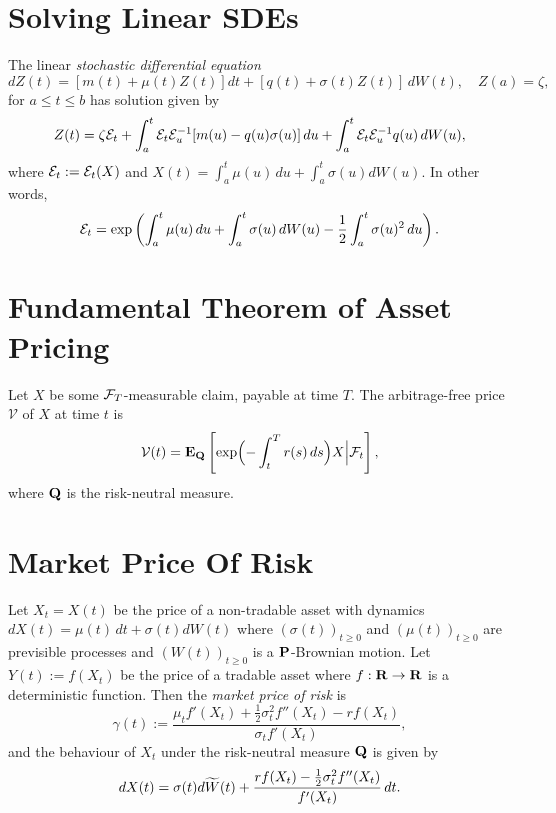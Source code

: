 \documentclass[twocolumn]{amsart}
\begin{document}
\section*{Solving Linear SDEs}

The linear \emph{stochastic differential equation}
\begin{equation*}
    dZ(t) = [m(t)+\mu(t)Z(t)]dt + [q(t)+\sigma(t)Z(t)]\,dW(t), \quad Z(a) = \zeta,
\end{equation*}
for $a \le t \le b$ has solution given by
\begin{equation*}
    Z(t) = \zeta \sE_t + \int_a^t \sE_t \sE_u^{-1}[m(u)-q(u)\sigma(u)]\,du + \int_a^t \sE_t \sE_u^{-1} q(u)\,dW(u),
\end{equation*}
where $\sE_t := \sE_t(X)$ and $X(t) = \int_a^t\mu(u)\,du + \int_a^t\sigma(u)dW(u)$. In other words,
\begin{equation*}
    \sE_t = \exp\left(\int_a^t\mu(u)\,du + \int_a^t\sigma(u)\,dW(u) - \frac{1}{2} \int_a^t \sigma(u)^2\,du\right).
\end{equation*}


\section*{Fundamental Theorem of Asset Pricing}

Let $X$ be some $\F_T$-measurable claim, payable at time $T$. The arbitrage-free price $\mathcal{V}$ of $X$ at time $t$ is
\begin{equation*}
    \mathcal{V}(t) = \EQ\left[\exp\Bigl(-\int_t^T r(s)\,ds\Bigr) X \Bigl| \F_t \Bigr.\right],
\end{equation*}
where $\Q$ is the risk-neutral measure.

\section*{Market Price Of Risk}

Let $X_t = X(t)$ be the price of a non-tradable asset with dynamics $dX(t) =  \mu(t)\,dt + \sigma(t) dW(t)$ where $(\sigma(t))_{t \ge 0}$ and $(\mu(t))_{t \ge 0}$ are previsible processes and $(W(t))_{t \ge 0}$ is a $\P$-Brownian motion. Let $Y(t) := f(X_t)$ be the price of a tradable asset where $f: \R \to \R$ is a deterministic function. Then the \emph{market price of risk} is
\[ \gamma(t) := \frac{\mu_t f'(X_t) + \frac{1}{2} \sigma_t^2 f''(X_t) - r f(X_t)}{\sigma_t f'(X_t)}, \]
and the behaviour of $X_t$ under the risk-neutral measure $\Q$ is given by
\[ dX(t) = \sigma(t) d \tW(t) + \frac{r f(X_t) - \frac{1}{2} \sigma_t^2 f''(X_t)}{f'(X_t)}\,dt. \]
\end{document}
